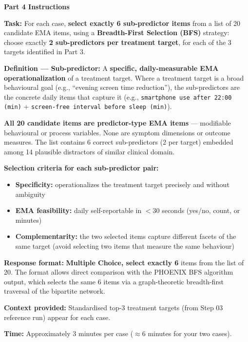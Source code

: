 \documentclass[11pt,a4paper]{article}
\begin{document}
\begin{tcolorbox}[colback=PartFourBG,colframe=RichPurple,arc=2.5mm,boxrule=0.9pt,left=10pt,right=10pt,top=9pt,bottom=9pt]
\textbf{\color{RichPurple}Part 4 Instructions}

\smallskip
\textbf{Task:} For each case, \textbf{select exactly 6 sub-predictor items} from a list of 20 candidate EMA items, using a \textbf{Breadth-First Selection (BFS)} strategy: choose exactly \textbf{2 sub-predictors per treatment target}, for each of the 3 targets identified in Part 3.

\textbf{Definition --- Sub-predictor:} A \textbf{specific, daily-measurable EMA operationalization} of a treatment target. Where a treatment target is a broad behavioural goal (e.g., ``evening screen time reduction''), the sub-predictors are the concrete daily items that capture it (e.g., \texttt{smartphone use after 22:00 (min)} + \texttt{screen-free interval before sleep (min)}).

\textbf{All 20 candidate items are predictor-type EMA items} --- modifiable behavioural or process variables. None are symptom dimensions or outcome measures. The list contains 6 correct sub-predictors (2 per target) embedded among 14 plausible distractors of similar clinical domain.

\textbf{Selection criteria for each sub-predictor pair:}
\begin{itemize}[topsep=3pt,itemsep=2pt]
\item \textbf{Specificity:} operationalizes the treatment target precisely and without ambiguity
\item \textbf{EMA feasibility:} daily self-reportable in $<$30 seconds (yes/no, count, or minutes)
\item \textbf{Complementarity:} the two selected items capture different facets of the same target (avoid selecting two items that measure the same behaviour)
\end{itemize}

\textbf{Response format:} \textbf{Multiple Choice, select exactly 6} items from the list of 20. The format allows direct comparison with the PHOENIX BFS algorithm output, which selects the same 6 items via a graph-theoretic breadth-first traversal of the bipartite network.

\textbf{Context provided:} Standardised top-3 treatment targets (from Step 03 reference run) appear for each case.

\textbf{Time:} Approximately 3 minutes per case ($\approx$6 minutes for your two cases).
\end{tcolorbox}
\end{document}

